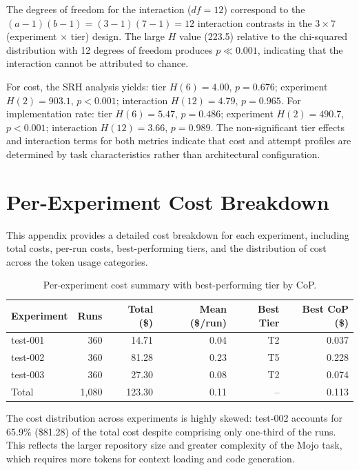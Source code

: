 \documentclass[11pt]{article}
\begin{document}
The degrees of freedom for the interaction ($df = 12$) correspond to the
$(a-1)(b-1) = (3-1)(7-1) = 12$ interaction contrasts in the $3 \times 7$
(experiment $\times$ tier) design. The large $H$ value (223.5) relative to
the chi-squared distribution with 12 degrees of freedom produces $p \ll 0.001$,
indicating that the interaction cannot be attributed to chance.

For cost, the SRH analysis yields: tier $H(6) = 4.00$, $p = 0.676$;
experiment $H(2) = 903.1$, $p < 0.001$; interaction $H(12) = 4.79$,
$p = 0.965$. For implementation rate: tier $H(6) = 5.47$, $p = 0.486$;
experiment $H(2) = 490.7$, $p < 0.001$; interaction $H(12) = 3.66$,
$p = 0.989$. The non-significant tier effects and interaction terms for both
metrics indicate that cost and attempt profiles are determined by task
characteristics rather than architectural configuration.

\section{Per-Experiment Cost Breakdown}
\label{app:cost_breakdown}

This appendix provides a detailed cost breakdown for each experiment,
including total costs, per-run costs, best-performing tiers, and the
distribution of cost across the token usage categories.

\begin{table}[htbp]
  \centering
  \caption{Per-experiment cost summary with best-performing tier by CoP.}
  \label{tab:cost_by_experiment}
  \small
  \begin{tabular}{lrrrrr}
    \toprule
    Experiment & Runs & Total (\$) & Mean (\$/run) & Best Tier & Best CoP (\$) \\
    \midrule
    test-001 & 360 & 14.71 & 0.04 & T2 & 0.037 \\
    test-002 & 360 & 81.28 & 0.23 & T5 & 0.228 \\
    test-003 & 360 & 27.30 & 0.08 & T2 & 0.074 \\
    \midrule
    Total & 1,080 & 123.30 & 0.11 & -- & 0.113 \\
    \bottomrule
  \end{tabular}
\end{table}

The cost distribution across experiments is highly skewed: test-002 accounts
for 65.9\% (\$81.28) of the total cost despite comprising only one-third of
the runs. This reflects the larger repository size and greater complexity of
the Mojo task, which requires more tokens for context loading and code
generation.
\end{document}
